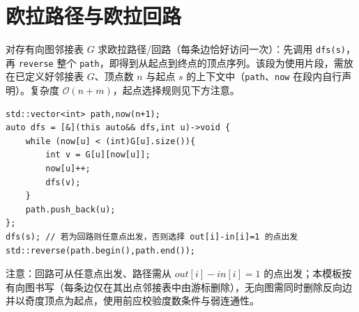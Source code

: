 \section{欧拉路径与欧拉回路}

对存有向图邻接表 $G$ 求欧拉路径/回路（每条边恰好访问一次）：先调用 \texttt{dfs(s)}，再 \texttt{reverse} 整个 \texttt{path}，即得到从起点到终点的顶点序列。该段为使用片段，需放在已定义好邻接表 $G$、顶点数 $n$ 与起点 $s$ 的上下文中（\texttt{path}、\texttt{now} 在段内自行声明）。复杂度 $\mathcal{O}(n+m)$，起点选择规则见下方注意。

\begin{lstlisting}
std::vector<int> path,now(n+1);
auto dfs = [&](this auto&& dfs,int u)->void {
    while (now[u] < (int)G[u].size()){
        int v = G[u][now[u]];
        now[u]++;
        dfs(v);
    }
    path.push_back(u);
};
dfs(s); // 若为回路则任意点出发，否则选择 out[i]-in[i]=1 的点出发
std::reverse(path.begin(),path.end());
\end{lstlisting}

注意：回路可从任意点出发、路径需从 $out[i]-in[i]=1$ 的点出发；本模板按有向图书写（每条边仅在其出点邻接表中由游标删除），无向图需同时删除反向边并以奇度顶点为起点，使用前应校验度数条件与弱连通性。
